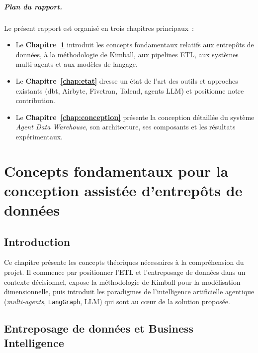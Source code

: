 \documentclass[12pt, a4paper]{report}
\begin{document}
\paragraph{Plan du rapport.}
Le présent rapport est organisé en trois chapitres principaux~:
\begin{itemize}
  \item Le \textbf{Chapitre~\ref{chap:concepts}} introduit les concepts
        fondamentaux relatifs aux entrepôts de données, à la
        méthodologie de Kimball, aux pipelines \ac{ETL}, aux systèmes
        multi-agents et aux modèles de langage.
  \item Le \textbf{Chapitre~\ref{chap:etat}} dresse un état de l'art
        des outils et approches existants (dbt, Airbyte, Fivetran,
        Talend, agents \ac{LLM}) et positionne notre contribution.
  \item Le \textbf{Chapitre~\ref{chap:conception}} présente la
        conception détaillée du système \emph{Agent Data Warehouse},
        son architecture, ses composants et les résultats expérimentaux.
\end{itemize}

\cleardoublepage

\chapter{Concepts fondamentaux pour la conception assistée d'entrepôts de données}
\label{chap:concepts}

\section{Introduction}
Ce chapitre présente les concepts théoriques nécessaires à la
compréhension du projet. Il commence par positionner l'\ac{ETL} et
l'entreposage de données dans un contexte décisionnel, expose la
méthodologie de Kimball pour la modélisation dimensionnelle, puis
introduit les paradigmes de l'intelligence artificielle agentique
(\emph{multi-agents}, \texttt{LangGraph}, \ac{LLM}) qui sont au cœur
de la solution proposée.

\section{Entreposage de données et Business Intelligence}
\end{document}
